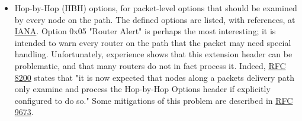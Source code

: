 \documentclass[
]{article}
\begin{document}
\begin{itemize}
\item
  Hop-by-Hop (HBH) options, for packet-level options that should be
  examined by every node on the path. The defined options are listed,
  with references, at
  \href{https://www.iana.org/assignments/ipv6-parameters/ipv6-parameters.xhtml\#ipv6-parameters-2}{IANA}.
  Option 0x05 "Router Alert" is perhaps the most interesting; it is
  intended to warn every router on the path that the packet may need
  special handling. Unfortunately, experience shows that this extension
  header can be problematic, and that many routers do not in fact
  process it. Indeed, \href{https://www.rfc-editor.org/info/rfc8200}{RFC
  8200} states that "it is now expected that nodes along a
  packet\textquotesingle s delivery path only examine and process the
  Hop-by-Hop Options header if explicitly configured to do so." Some
  mitigations of this problem are described in
  \href{https://www.rfc-editor.org/info/rfc9673}{RFC 9673}.


\end{itemize}
\end{document}
